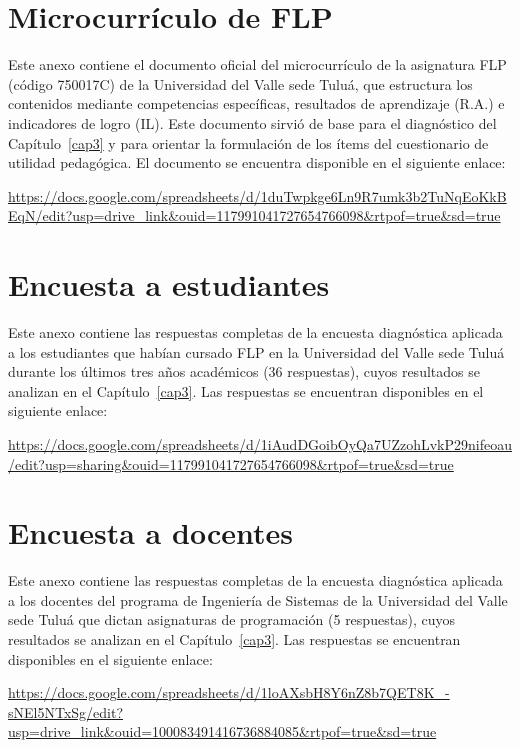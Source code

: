 \chapter{Microcurrículo de FLP}
\label{annex:microcurriculum}

Este anexo contiene el documento oficial del microcurrículo de la asignatura FLP (código 750017C) de la Universidad del Valle sede Tuluá, que estructura los contenidos mediante competencias específicas, resultados de aprendizaje (R.A.) e indicadores de logro (IL). Este documento sirvió de base para el diagnóstico del Capítulo~\ref{cap3} y para orientar la formulación de los ítems del cuestionario de utilidad pedagógica. El documento se encuentra disponible en el siguiente enlace:

\noindent\url{https://docs.google.com/spreadsheets/d/1duTwpkge6Ln9R7umk3b2TuNqEoKkBEqN/edit?usp=drive_link&ouid=117991041727654766098&rtpof=true&sd=true}

\chapter{Encuesta a estudiantes}
\label{annex:students}

Este anexo contiene las respuestas completas de la encuesta diagnóstica aplicada a los estudiantes que habían cursado FLP en la Universidad del Valle sede Tuluá durante los últimos tres años académicos (36 respuestas), cuyos resultados se analizan en el Capítulo~\ref{cap3}. Las respuestas se encuentran disponibles en el siguiente enlace:

\noindent\url{https://docs.google.com/spreadsheets/d/1iAudDGoibOyQa7UZzohLvkP29nifeoau/edit?usp=sharing&ouid=117991041727654766098&rtpof=true&sd=true}

\chapter{Encuesta a docentes}
\label{annex:teachers}

Este anexo contiene las respuestas completas de la encuesta diagnóstica aplicada a los docentes del programa de Ingeniería de Sistemas de la Universidad del Valle sede Tuluá que dictan asignaturas de programación (5 respuestas), cuyos resultados se analizan en el Capítulo~\ref{cap3}. Las respuestas se encuentran disponibles en el siguiente enlace:

\noindent\url{https://docs.google.com/spreadsheets/d/1loAXsbH8Y6nZ8b7QET8K_-sNEl5NTxSg/edit?usp=drive_link&ouid=100083491416736884085&rtpof=true&sd=true}

